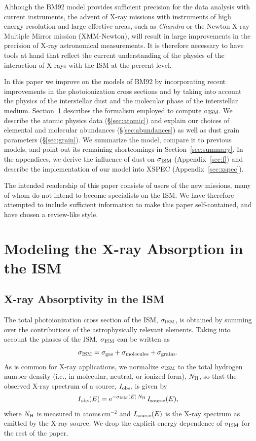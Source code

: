 \documentclass{aastex}
\newcommand{\sigism}{\ensuremath{\sigma_{\rm ISM}}}
\begin{document}
Although the BM92 model provides sufficient precision for the data
analysis with current instruments, the advent of X-ray missions with
instruments of high energy resolution and large effective areas, such
as \textsl{Chandra} or  the Newton X-ray Multiple Mirror mission
(XMM-Newton), will result in large improvements in the precision of X-ray
astronomical measurements.  It is therefore necessary to have tools at
hand that reflect the current understanding of the physics of the
interaction of X-rays with the ISM at the percent level.

In this paper we improve on the models of BM92 by incorporating
recent improvements in the photoionization cross sections and by
taking into account the physics of the interstellar dust and the
molecular phase of the interstellar medium.
Section~\ref{sec:model} describes the formalism employed to
compute $\sigism$. We describe the atomic physics data
(\S\ref{sec:atomic}) and explain our choices of elemental and
molecular abundances (\S\ref{sec:abundances}) as well as dust grain
parameters (\S\ref{sec:grain}).  We summarize the model, compare
it to previous models, and point out its remaining shortcomings
in Section~\ref{sec:summary}.  In the appendices, we derive the
influence of dust on $\sigism$ (Appendix~\ref{sec:f}) and
describe the implementation of our model into XSPEC
(Appendix~\ref{sec:xspec}).

The intended readership of this paper consists of users of the
new missions, many of whom do not intend to become specialists on
the ISM. We have therefore attempted to include sufficient
information to make this paper self-contained, and have chosen a
review-like style.

\section{Modeling the X-ray Absorption in the ISM}\label{sec:model}

\subsection{X-ray Absorptivity in the ISM}\label{sec:int}
The total photoionization cross section of the ISM, $\sigism$, is
obtained by summing over the contributions of the astrophysically
relevant elements. Taking into account the phases of the ISM,
$\sigism$ can be written as
\begin{equation}\label{eq:sigism}
\sigism = \sigma_{\rm gas} + \sigma_{\rm
  molecules} + \sigma_{\rm grains}. 
\end{equation}
As is common for X-ray applications, we normalize $\sigism$ to the
total hydrogen number density (i.e., in molecular, neutral, or ionized
form), $N_{\rm H}$, so that the observed X-ray spectrum of a source,
$I_{\rm obs}$, is given by
\begin{equation}
I_{\rm obs}(E) = {\rm e}^{-\sigism(E)\,N_{\rm H}}\,I_{\rm
    source}(E),
\end{equation}
where $N_{\rm H}$ is measured in atoms\,cm$^{-2}$ and $I_{\rm source}(E)$ is
the X-ray spectrum as emitted by the X-ray source. We drop
the explicit energy dependence of $\sigism$ for the rest of the paper.
\end{document}
